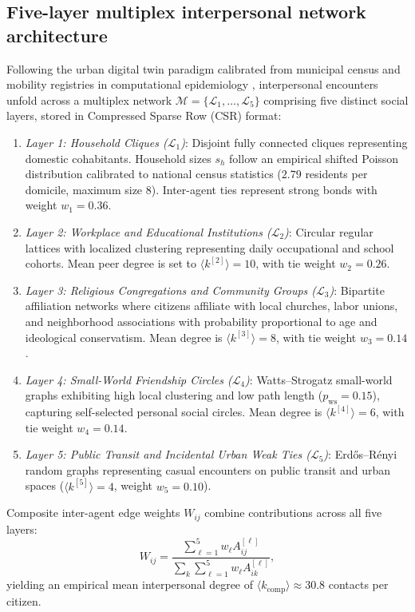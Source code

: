 \documentclass[11pt,a4paper]{article}
\begin{document}
\subsection{Five-layer multiplex interpersonal network architecture}
\label{sssec:multiplex_network_topology}
Following the urban digital twin paradigm calibrated from municipal census and mobility registries in computational epidemiology \citep{lopes2022measuring}, interpersonal encounters unfold across a multiplex network $\mathcal{M} = \{\mathcal{L}_1, \dots, \mathcal{L}_5\}$ comprising five distinct social layers, stored in Compressed Sparse Row (CSR) format:

\begin{enumerate}
    \item \emph{Layer 1: Household Cliques ($\mathcal{L}_1$)}: Disjoint fully connected cliques representing domestic cohabitants. Household sizes $s_h$ follow an empirical shifted Poisson distribution calibrated to national census statistics ($2.79$ residents per domicile, maximum size 8). Inter-agent ties represent strong bonds with weight $w_1 = 0.36$.
    \item \emph{Layer 2: Workplace and Educational Institutions ($\mathcal{L}_2$)}: Circular regular lattices with localized clustering representing daily occupational and school cohorts. Mean peer degree is set to $\langle k^{[2]} \rangle = 10$, with tie weight $w_2 = 0.26$.
    \item \emph{Layer 3: Religious Congregations and Community Groups ($\mathcal{L}_3$)}: Bipartite affiliation networks where citizens affiliate with local churches, labor unions, and neighborhood associations with probability proportional to age and ideological conservatism. Mean degree is $\langle k^{[3]} \rangle = 8$, with tie weight $w_3 = 0.14$.
    \item \emph{Layer 4: Small-World Friendship Circles ($\mathcal{L}_4$)}: Watts--Strogatz small-world graphs exhibiting high local clustering and low path length ($p_{\mathrm{ws}} = 0.15$), capturing self-selected personal social circles. Mean degree is $\langle k^{[4]} \rangle = 6$, with tie weight $w_4 = 0.14$.
    \item \emph{Layer 5: Public Transit and Incidental Urban Weak Ties ($\mathcal{L}_5$)}: Erd\H{o}s--R\'enyi random graphs representing casual encounters on public transit and urban spaces ($\langle k^{[5]} \rangle = 4$, weight $w_5 = 0.10$).
\end{enumerate}

Composite inter-agent edge weights $W_{ij}$ combine contributions across all five layers:
\begin{equation}
    W_{ij} = \frac{\sum_{\ell=1}^5 w_\ell A_{ij}^{[\ell]}}{\sum_{k} \sum_{\ell=1}^5 w_\ell A_{ik}^{[\ell]}},
    \label{eq:composite_edge_weight}
\end{equation}
yielding an empirical mean interpersonal degree of $\langle k_{\mathrm{comp}} \rangle \approx 30.8$ contacts per citizen.
\end{document}
